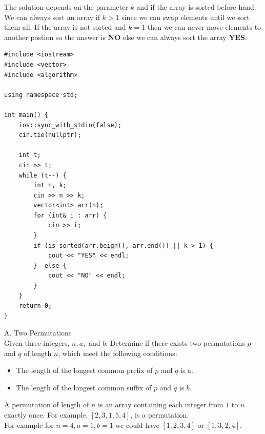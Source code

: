 \documentclass[11pt]{scrartcl}
\begin{document}
\begin{solution}
    The solution depends on the parameter $k$ and if the array is sorted before hand. We can always sort an array if $k > 1$ since
    we can swap elements until we sort them all.  If the array is not sorted and $k = 1$ then we can never move elements to another postion 
    so the answer is \textbf{NO} else we can always sort the array \textbf{YES}.

\begin{lstlisting}
#include <iostream>
#include <vector>
#include <algorithm>

using namespace std;

int main() {
    ios::sync_with_stdio(false);
    cin.tie(nullptr);

    int t;
    cin >> t;
    while (t--) {
        int n, k;
        cin >> n >> k;
        vector<int> arr(n);
        for (int& i : arr) {
            cin >> i;
        }
        if (is_sorted(arr.beign(), arr.end()) || k > 1) {
            cout << "YES" << endl;
        }  else {
            cout << "NO" << endl;
        }
    }
    return 0;
}
\end{lstlisting}
\end{solution}

\newpage

  \begin{problem}
    A. Two Permutations \\ 

    Given three integers, $n, a,$ and $b$. Determine if there exists two permutations $p$ and $q$ of length $n$, which 
    meet the following conditions: 
      \begin{itemize}
        \item The length of the longest common prefix of $p$ and $q$ is a.
        \item The length of the longest common suffix of $p$ and $q$ is $b$.
      \end{itemize}
      A permutation of length of $n$ is an array containing each integer from $1$ to $n$ exactly once. For 
      example, $[2,3,1,5,4]$, is a permutation. \\ 

      For example for $n = 4, a = 1, b = 1$ we could have $[1,2,3,4]$ or $[1,3,2,4]$.
\end{problem}
\end{document}
